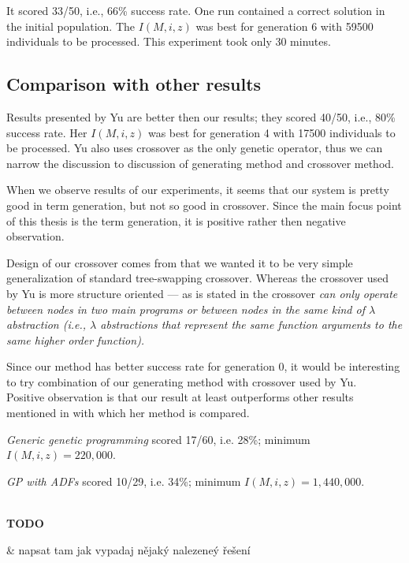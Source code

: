 \documentclass[12pt,a4paper]{report}
\newenvironment{todo}
{ ~\\[0.5em]
  {\color{red}\textbf{TODO}}
  \begin{easylist}[itemize]}
{ \end{easylist}
  ~}
\begin{document}
It scored 33/50, i.e., 66\% success rate. One run
contained a correct solution in the initial population.
The $I(M,i,z)$ was best for generation 6 with 59500 
individuals to be processed.
This experiment took only 30 minutes. \\

\subsection{Comparison with other results}

Results presented by Yu \cite{yu01} are better then our results;
they scored 40/50, i.e., 80\% success rate.  
Her $I(M,i,z)$ was best for generation 4 with 17500 
individuals to be processed.
Yu also uses crossover as the only genetic operator, thus we
can narrow the discussion to discussion of generating method and 
crossover method. 

When we observe results of our experiments, it seems
that our system is pretty good in term generation, but not so good 
in crossover. Since the main focus point of this thesis is
the term generation, it is positive rather then negative observation.

Design of our crossover comes from that we wanted it to be
very simple generalization of standard tree-swapping crossover.
Whereas the crossover used by Yu is more structure oriented
--- as is stated in \cite{yu01} the crossover \textit{can only operate 
between nodes in two main programs or between nodes in the same
kind of $\lambda$ abstraction (i.e., $\lambda$ abstractions that 
represent the same function arguments to the same higher order function).}

Since our method has better success rate for generation 0, it would 
be interesting to try combination of our generating 
method with crossover used by Yu.\\

Positive observation is that our result at least outperforms 
other results mentioned in \cite{yu01} with which her method is compared.


\textit{Generic genetic programming} scored 17/60, i.e. 28\%; 
minimum $I(M,i,z) = 220,000$.

\textit{GP with ADFs} scored 10/29, i.e. 34\%; 
minimum $I(M,i,z) = 1,440,000$.


\begin{todo}
& napsat tam jak vypadaj nějaký nalezeneý řešení
\end{todo} 
\end{document}
